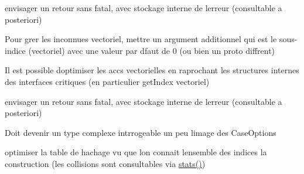 
\begin{DoxyRefList}
\item[Member \mbox{\hyperlink{structFunctionParser_ae2cdbc565a026ee6db3aa016ce4271cb}{Function\+Parser\+::parse\+String}} (const String \&s)]\label{todo__todo000005}%
%
envisager un retour sans fatal, avec stockage interne de l\textquotesingle{}erreur (consultable a posteriori)  
\item[Class \mbox{\hyperlink{classIIndexManager}{IIndex\+Manager}} ]\label{todo__todo000004}%
%
Pour g{\ucr}rer les inconnues vectoriel, mettre un argument additionnel qui est le sous-\/indice (vectoriel) avec une valeur par d{\ucr}faut de 0 (ou bien un proto diff{\ucr}rent)  
\item[Class \mbox{\hyperlink{classBasicIndexManager}{Basic\+Index\+Manager}} ]\label{todo__todo000002}%
%
Il est possible d\textquotesingle{}optimiser les acc{\ucr}s vectorielles en raprochant les structures internes des interfaces critiques (en particulier get\+Index vectoriel)  
\item[Member \mbox{\hyperlink{structFunctionParser_ae2cdbc565a026ee6db3aa016ce4271cb}{Function\+Parser\+::parse\+String}} (const String \&s)]\label{todo__todo000007}%
%
envisager un retour sans fatal, avec stockage interne de l\textquotesingle{}erreur (consultable a posteriori)  
\item[Member \mbox{\hyperlink{classIBaseLinearSolver_a09622601dba23ea77701753cf49b2bf0}{IBase\+Linear\+Solver\+::Status}} ]\label{todo__todo000006}%
%
Doit devenir un type complexe int{\ucr}rrogeable un peu {\ucr} l\textquotesingle{}image des Case\+Options  
\item[Class \mbox{\hyperlink{classItemGroupMapAbstract}{Item\+Group\+Map\+Abstract}} ]\label{todo__todo000008}%
%
optimiser la table de hachage vu que l\textquotesingle{}on connait l\textquotesingle{}ensemble des indices {\ucr} la construction (les collisions sont consultables via \mbox{\hyperlink{classItemGroupMapAbstract_aa5ea20f4623f6765a9ce7a4dacf7bef5}{stats()}}) 
\end{DoxyRefList}